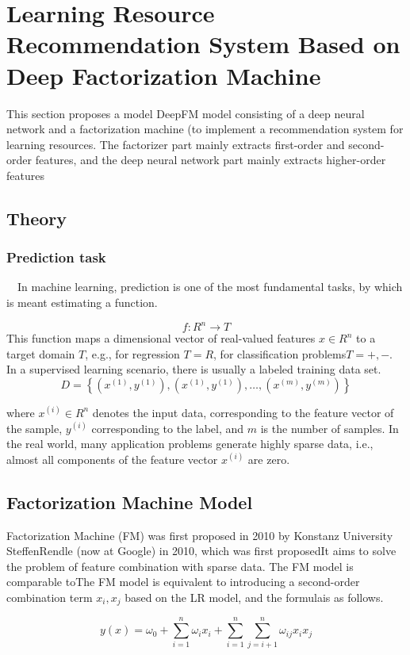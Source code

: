 \documentclass[11pt,en]{elegantpaper}
\begin{document}
\clearpage
\section{Learning Resource Recommendation System Based on Deep Factorization Machine}
This section proposes a model DeepFM model consisting of a deep neural network and a factorization machine (to implement a recommendation system for learning resources. The factorizer part mainly extracts first-order and second-order features, and the deep neural network part mainly extracts higher-order features

\subsection{Theory}
\subsubsection{Prediction task}
 In machine learning, prediction is one of the most fundamental tasks, by which is meant estimating a function.


$$
f: R^{n} \rightarrow T
$$
This function maps a dimensional vector of real-valued features $x\in R^n$ to a target domain $T$, e.g., for regression $T=R$, for classification problems$T=+,-$. In a supervised learning scenario, there is usually a labeled training data set.
$$D=\left\{\left(x^{(1)}, y^{(1)}\right),\left(x^{(1)}, y^{(1)}\right), \ldots,\left(x^{(m)}, y^{(m)}\right)\right\}$$

where $x^{(i)}\in R^n$ denotes the input data, corresponding to the feature vector of the sample, $y^{(i)}$ corresponding to the label, and $m$ is the number of samples. In the real world, many application problems generate highly sparse data, i.e., almost all components of the feature vector $x^{(i)}$ are zero.

\subsection{Factorization Machine Model}
Factorization Machine (FM) was first proposed in 2010 by Konstanz University SteffenRendle (now at Google) in 2010, which was first proposedIt aims to solve the problem of feature combination with sparse data. The FM model is comparable toThe FM model is equivalent to introducing a second-order combination term $x_i,x_j$ based on the LR model, and the formulais as follows.

$$
y(x)=\omega_{0}+\sum_{i=1}^{n} \omega_{i} x_{i}+\sum_{i=1}^{n} \sum_{j=i+1}^{n} \omega_{i j} x_{i} x_{j}
$$
\end{document}
